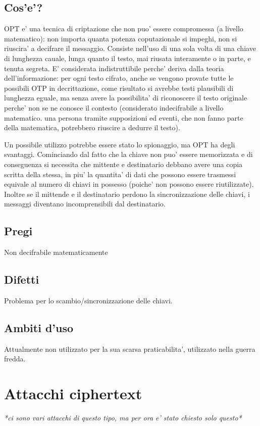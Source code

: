 \subsection{Cos'e'?}
OPT e' una tecnica di criptazione che non puo' essere compromessa (a livello matematico): non importa quanta potenza coputazionale si impeghi, non si riuscira' a decifrare il messaggio. Consiste nell'uso di una sola volta di una chiave di lunghezza cauale, lunga quanto il testo, mai riusata interamente o in parte, e tenuta segreta. E' considerata indistruttibile perche' deriva dalla teoria dell'informazione: per ogni testo cifrato, anche se vengono provate tutte le possibili OTP in decrittazione, come risultato si avrebbe testi plausibili di lunghezza eguale, ma senza avere la possibilita' di riconoscere il testo originale perche' non se ne conosce il contesto (considerato indecifrabile a livello matematico. una persona tramite supposizioni ed eventi, che non fanno parte della matematica, potrebbero riuscire a dedurre il testo). 

Un possibile utilizzo potrebbe essere stato lo spionaggio, ma OPT ha degli svantaggi. Cominciando dal fatto che la chiave non puo' essere memorizzata e di conseguenza si necessita che mittente e destinatario debbano avere una copia scritta della stessa, in piu' la quantita' di dati che possono essere trasmessi equivale al numero di chiavi in possesso (poiche' non possono essere riutilizzate). Inoltre se il mittende e il destinatario perdono la sincronizzazione delle chiavi, i messaggi diventano incomprensibili dal destinatario.
\subsection{Pregi}
Non decifrabile matematicamente
\subsection{Difetti}
Problema per lo scambio/sincronizzazione delle chiavi.
\subsection{Ambiti d'uso}
Attualmente non utilizzato per la sua scarsa praticabilita', utilizzato nella guerra fredda.
\section{Attacchi ciphertext}
\textit{*ci sono vari attacchi di questo tipo, ma per ora e' stato chiesto solo questo*}
